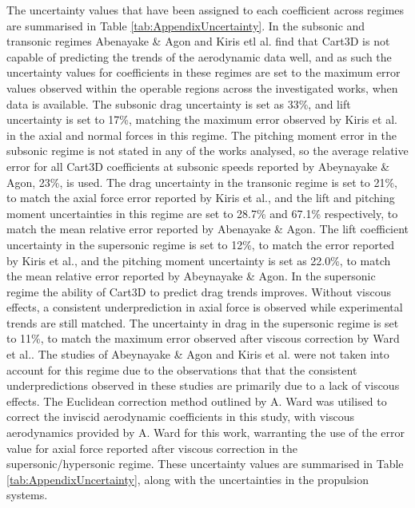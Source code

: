   The uncertainty values that have been assigned to each coefficient across regimes are summarised in Table \ref{tab:AppendixUncertainty}.
  In the subsonic and transonic regimes Abenayake \& Agon and Kiris etl al. find that Cart3D is not capable of predicting the trends of the aerodynamic data well\cite{Abeynayake2013a,Kiris2011}, and as such the uncertainty values for coefficients in these regimes are set to the maximum error values observed within the operable regions across the investigated works, when data is available.
  The subsonic drag uncertainty is set as 33\%, and lift uncertainty is set to 17\%, matching the  maximum error observed by Kiris et al.\cite{Kiris2011} in the axial and normal forces in this regime. 
The pitching moment error in the subsonic regime is not stated in any of the works analysed, so the average relative error for all Cart3D coefficients at subsonic speeds reported by Abeynayake \& Agon\cite{Abeynayake2013a}, 23\%, is used.
The drag uncertainty in the transonic regime is set to 21\%, to match the axial force error reported by Kiris et al.\cite{Kiris2011}, and the lift and pitching moment uncertainties in this regime are set to 28.7\% and 67.1\% respectively, to match the mean relative error reported by Abenayake \& Agon\cite{Abeynayake2013a}. 
The lift coefficient uncertainty in the supersonic regime is set to 12\%, to match the error reported by Kiris et al.\cite{Kiris2011}, and the pitching moment uncertainty is set as 22.0\%, to match the mean relative error reported by Abeynayake \& Agon\cite{Abeynayake2013a}. 
In the supersonic regime the ability of Cart3D to predict drag trends improves. Without viscous effects, a consistent underprediction in axial force is observed while experimental trends are still matched\cite{Abeynayake2013a,Ward2018,Kiris2011}. The uncertainty in drag in the supersonic regime is set to 11\%, to match the maximum error observed after viscous correction by Ward et al.\cite{Ward2018}. The studies of Abeynayake \& Agon\cite{Abeynayake2013a} and Kiris et al.\cite{Kiris2011} were not taken into account for this regime due to the observations that that the consistent underpredictions observed in these studies are primarily due to a lack of viscous effects. The Euclidean correction method outlined by A. Ward was utilised to correct the inviscid aerodynamic coefficients in this study, with viscous aerodynamics provided by A. Ward for this work, warranting the use of the error value for axial force reported after viscous correction in the supersonic/hypersonic regime. 
These uncertainty values are summarised in Table \ref{tab:AppendixUncertainty}, along with the uncertainties in the propulsion systems. 




